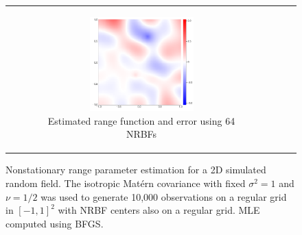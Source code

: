 \documentclass{article}
\numberwithin{equation}{section}
\begin{document}
\begin{figure}[t!]
\begin{tabular}{ccc}
{\begin{subfigure}[t]{0.6\textwidth}
        \includegraphics[width=0.5\textwidth]{figures/isotropic/err-nsr-p10000-a64.pdf}
        \caption{Estimated range function and error using 64 NRBFs}
      \end{subfigure}
    }
  \end{tabular}
  \caption{Nonstationary range parameter estimation for a 2D simulated random field. The isotropic Mat\'ern covariance with fixed $\sigma^2=1$ and $\nu=1/2$ was used to generate 10,000 observations on a regular grid in $[-1,1]^2$ with NRBF centers also on a regular grid. MLE computed using BFGS.}
  \label{}
\end{figure}

{}

\end{document}
